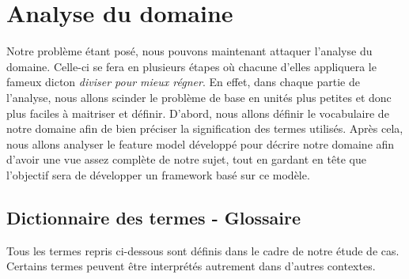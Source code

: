 \section{Analyse du domaine}

Notre problème étant posé,  nous pouvons maintenant attaquer l'analyse du domaine.  Celle-ci se fera en plusieurs étapes où chacune d'elles appliquera le fameux dicton \textit{diviser pour mieux régner}.  En effet,  dans chaque partie de l'analyse,  nous allons scinder le problème de base en unités plus petites et donc plus faciles à maitriser et définir.  D'abord,  nous allons définir  le vocabulaire de notre domaine afin de bien préciser la signification des termes utilisés.  Après cela,  nous allons analyser le feature model développé pour décrire notre domaine afin d'avoir une vue assez complète de notre sujet,  tout en gardant en tête que l'objectif sera de développer un framework basé sur ce modèle.  

\subsection{Dictionnaire des termes - Glossaire}
\label{dicoTermes}
Tous les termes repris ci-dessous sont définis dans le cadre de notre étude de cas.  Certains termes peuvent être interprétés autrement dans d'autres contextes.

